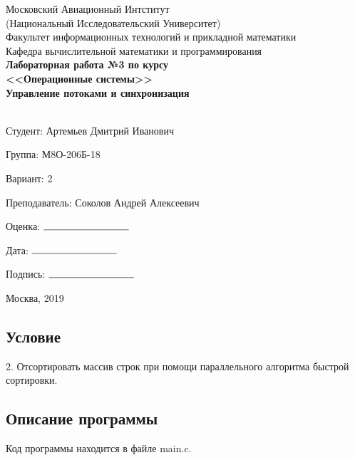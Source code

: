 \documentclass[12pt]{article}
\begin{document}
\begin{titlepage}
  \large
  \begin{center} 
    
      Московский Авиационный Интститут \\
      (Национальный Исследовательский Университет) \\
      Факультет информационных технологий и прикладной математики \\
      Кафедра вычислительной математики и программирования \\
      \vfill\vfill
      \textbf{
        { Лабораторная работа №3 по курсу} \\ 
        <<Операционные системы>> \\
        \bigskip
            {Управление потоками и синхронизация } \\
    } \\
  \end{center}
  \vfill

  \begin{flushright}

    Студент:  {Артемьев Дмитрий Иванович}

    Группа: {М8О-206Б-18}

    Вариант: {2}
    
    Преподаватель: {Соколов Андрей Алексеевич}

    Оценка: $\rule{3cm}{0.15mm}$

    Дата: $\rule{3cm}{0.15mm}$
    
    Подпись: $\rule{3cm}{0.15mm}$

  \end{flushright}
  \vfill
  \begin{center}
    Москва, 2019
  \end{center}
  
\end{titlepage}

\subsection*{Условие}

2. Отсортировать массив строк при помощи параллельного алгоритма быстрой сортировки.

\subsection*{Описание программы}

Код программы находится в файле main.c.
\end{document}

